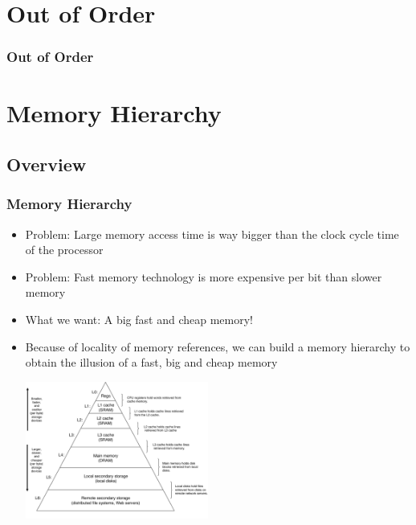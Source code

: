 \documentclass{beamer}
\begin{document}
\fi

\section{Out of Order}

\begin{frame}%
\frametitle{Out of Order}

\end{frame}

\section{Memory Hierarchy}

\subsection{Overview}

\begin{frame}%
\frametitle{Memory Hierarchy}

\scriptsize

\begin{itemize}

\item Problem: Large memory access time is way bigger than the clock cycle time of the processor


\item Problem: Fast memory technology is more expensive per bit than slower memory


\item What we want: A big fast and cheap memory!


\item Because of locality of memory references, we can build a memory hierarchy to obtain the illusion
  of a fast, big and cheap memory

  \vspace{0.25cm}

\begin{center}
\includegraphics[width=6cm]{memhier.pdf}
\end{center}


\end{itemize}

\end{frame}
\end{document}
